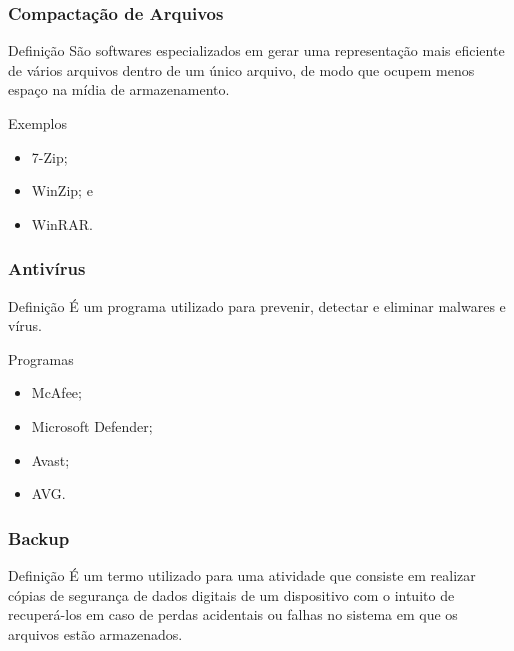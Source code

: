 \documentclass[aspectratio=169]{beamer} %
\begin{document}
\begin{frame}
	\frametitle{Compacta\c cão de Arquivos}
	
	\begin{block}{Defini\c cão}
		São softwares especializados em gerar uma representação mais eficiente de vários arquivos dentro de um único arquivo, de modo que ocupem menos espaço na mídia de armazenamento.
	\end{block} \vfill
	
	\begin{exampleblock}{Exemplos}
		\begin{itemize}
			\item 7-Zip;
			\item WinZip; e
			\item WinRAR.
		\end{itemize}
	\end{exampleblock}
\end{frame}

\begin{frame}
	\frametitle{Antivírus}
	
	\begin{block}{Defini\c cão}
		É um programa utilizado para prevenir, detectar e eliminar malwares e vírus.
	\end{block}\vfill

	\begin{exampleblock}{Programas}
		\begin{itemize}
			\item McAfee;
			\item Microsoft Defender;
			\item Avast;
			\item AVG.
		\end{itemize}
	\end{exampleblock}
\end{frame}

\begin{frame}
	\frametitle{Backup}
	
	\begin{block}{Defini\c cão}
		É um termo utilizado para uma atividade que consiste em realizar cópias de segurança de dados digitais de um dispositivo com o intuito de recuperá-los em caso de perdas acidentais ou falhas no sistema em que os arquivos estão armazenados.
	\end{block}
\end{frame}
\end{document}
